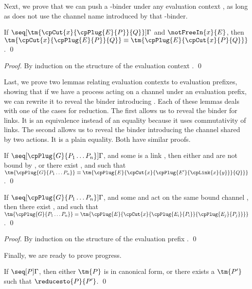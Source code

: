 \documentclass[UKenglish]{llncs}
\begin{document}
Next, we prove that we can push a \textnu-binder under any evaluation context
, as long as  does not use the channel name introduced by that
\textnu-binder.
\begin{lemma}\label{thm:cp-display-cut}
  If $\seq[{ \tm{\cpCut{x}{\cpPlug{E}{P}}{Q}} }]{ \Gamma }$ and
  $\notFreeIn{x}{E}$, then $\tm{\cpCut{x}{\cpPlug{E}{P}}{Q}} \equiv
  \tm{\cpPlug{E}{\cpCut{x}{P}{Q}}}$. 
  \qed
\end{lemma}
\begin{proof}
  By induction on the structure of the evaluation context .
  \qed
\end{proof}
Last, we prove two lemmas relating evaluation contexts to evaluation prefixes,
showing that if we have a process acting on a channel  under an evaluation
prefix, we can rewrite it to reveal the binder introducing .
Each of these lemmas deals with one of the cases for reduction.
The first allows us to reveal the binder for links.
It is an equivalence instead of an equality because it uses commutativity of
links. 
The second allows us to reveal the binder introducing the channel shared by two
actions. It is a plain equality.
Both have similar proofs.
\begin{lemma}\label{thm:cp-progress-link}
  If $\seq[{ \cpPlug{G}{P_1 \dots P_n} }]{ \Gamma }$, and some  is a
  link , then either  and  are not bound by
  , or there exist ,  and  such that
  \(
  \tm{\cpPlug{G}{P_1 \dots P_n}} \equiv
  \tm{\cpPlug{E}{\cpCut{x}{\cpPlug{E'}{\cpLink{x}{y}}}{Q}}}
  \).
  \qed
\end{lemma}
\begin{lemma}\label{thm:cp-progress-beta}
  If $\seq[{ \cpPlug{G}{P_1 \dots P_n} }]{ \Gamma }$, and some  and
   act on the same bound channel , then there exist ,
   and  such that
  \(
  \tm{\cpPlug{G}{P_1 \dots P_n}} =
  \tm{\cpPlug{E}{\cpCut{x}{\cpPlug{E_i}{P_i}}{\cpPlug{E_j}{P_j}}}}
  \).
  \qed
\end{lemma}
\begin{proof}
  By induction on the structure of the evaluation prefix .
  \qed
\end{proof}
Finally, we are ready to prove progress.
\begin{theorem}[Progress]\label{thm:cp-progress}
  If $\seq[{ P }]{ \Gamma }$, then either $\tm{P}$ is in canonical form, or
  there exists a $\tm{P'}$ such that $\reducesto{P}{P'}$. 
  \qed
\end{theorem}
\end{document}
